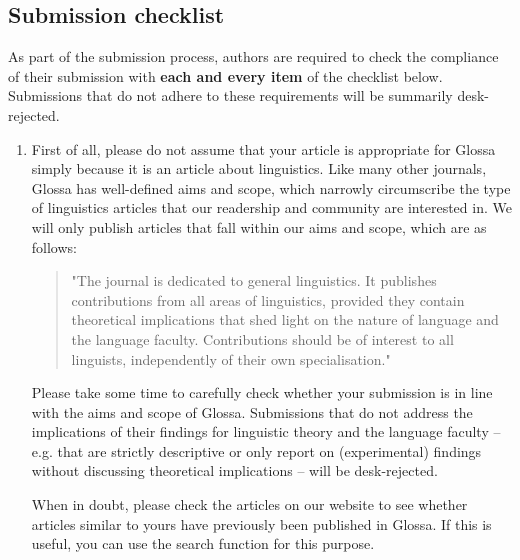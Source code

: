 \documentclass[charis,linguex]{glossa}
\begin{document}
\subsection{Submission checklist}

As part of the submission process, authors are required to check the compliance of their submission with \textbf{each and every item} of the  checklist below. Submissions that do not adhere to these requirements will be summarily desk-rejected.

\begin{enumerate}[label=\arabic*.]
\item First of all, please do not assume that your article is appropriate for Glossa simply because it is an article about linguistics. Like many other journals, Glossa has well-defined aims and scope, which narrowly circumscribe the type of linguistics articles that our readership and community are interested in. We will only publish articles that fall within our aims and scope, which are as follows: 
\begin{quote} "The journal is dedicated to general linguistics. It publishes contributions from all areas of linguistics, provided they contain theoretical implications that shed light on the nature of language and the language faculty. Contributions should be of interest to all linguists, independently of their own specialisation."
\end{quote}
Please take some time to carefully check whether your submission is in line with the aims and scope of Glossa. Submissions that do not address the implications of their findings for linguistic theory and the language faculty – e.g. that are strictly descriptive or only report on (experimental) findings without discussing theoretical implications – will be desk-rejected. 

When in doubt, please check the articles on our website to see whether articles similar to yours have previously been published in Glossa. If this is useful, you can use the search function for this purpose. 


\end{enumerate}
\end{document}

